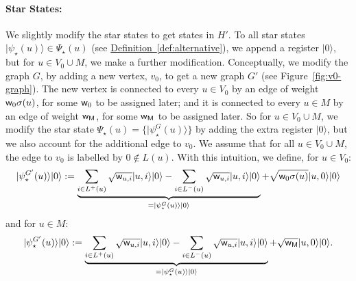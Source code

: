 \documentclass{article}
\newcommand{\defin}[1]{\hyperref[def:#1]{Definition~\ref*{def:#1}}}
\def\ket#1{{\lvert}#1\rangle}
\renewcommand{\>}{\rangle}
\newcommand{\<}{\langle}
\renewcommand{\(}{\left(}
\renewcommand{\)}{\right)}
\def\w{{\sf w}}
\begin{document}
\paragraph{Star States:} We slightly modify the star states to get states in $H'$. To all star states $\ket{\psi_\star(u)}\in \Psi_\star(u)$ (see \defin{alternative}), we append a register $\ket{0}$, but for $u\in V_0\cup M$, we make a further modification. 
Conceptually, we modify the graph $G$, by adding a new vertex, $v_0$, to get a new graph $G'$ (see Figure~\ref{fig:v0-graph}). The new vertex is connected to every $u\in V_0$ by an edge of weight $\w_0\sigma(u)$, for some $\w_0$ to be assigned later; and it is connected to every $u\in M$ by an edge of weight $\w_{\sf M}$, for some $\w_{\sf M}$ to be assigned later.  So for $u\in V_0\cup M$, we modify the star state $\Psi_\star(u)=\{\ket{\psi_\star^G(u)}\}$ by adding the extra register $\ket{0}$, but we also account for the additional edge to $v_0$. We assume that for all $u\in V_0\cup M$, the edge to $v_0$ is labelled by $0\not\in L(u)$. With this intuition, we define, for $u\in V_0$:
\begin{equation}
\ket{\psi_{\star}^{G'}(u)}\ket{0}:=\underbrace{
\sum_{i\in L^+(u)}\sqrt{\w_{u,i}}\ket{u,i}\ket{0} - \sum_{i\in L^-(u)}\sqrt{\w_{u,i}}\ket{u,i}\ket{0}  
}_{=\ket{\psi_\star^G(u)}\ket{0}}
+\sqrt{\w_0\sigma(u)}\ket{u,0}\ket{0}\label{eq:psi-star-F-1}
\end{equation}
and for $u\in M$:
\begin{equation}
\ket{\psi_{\star}^{G'}(u)}\ket{0}:=\underbrace{
\sum_{i\in L^+(u)}\sqrt{\w_{u,i}}\ket{u,i}\ket{0} - \sum_{i\in L^-(u)}\sqrt{\w_{u,i}}\ket{u,i}\ket{0}  
}_{=\ket{\psi_\star^G(u)}\ket{0}}
+\sqrt{\w_{\sf M}}\ket{u,0}\ket{0}.\label{eq:psi-star-F-M}
\end{equation}
\end{document}
